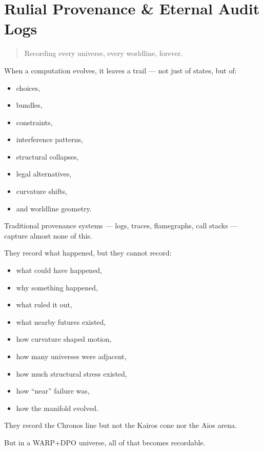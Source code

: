 \chapter{Rulial Provenance \& Eternal Audit Logs}\label{chapter-19-rulial-provenance-eternal-audit-logs}

\begin{quote}
Recording every universe, every worldline, forever.
\end{quote}

When a computation evolves, it leaves a trail --- not just of states,
but of:

\begin{itemize}
\tightlist
\item
  choices,
\item
  bundles,
\item
  constraints,
\item
  interference patterns,
\item
  structural collapses,
\item
  legal alternatives,
\item
  curvature shifts,
\item
  and worldline geometry.
\end{itemize}

Traditional provenance systems --- logs, traces, flamegraphs, call
stacks --- capture almost none of this.

They record what happened, but they cannot record:

\begin{itemize}
\tightlist
\item
  what could have happened,
\item
  why something happened,
\item
  what ruled it out,
\item
  what nearby futures existed,
\item
  how curvature shaped motion,
\item
  how many universes were adjacent,
\item
  how much structural stress existed,
\item
  how ``near'' failure was,
\item
  how the manifold evolved.
\end{itemize}

They record the Chronos line but not the Kairos cone nor the Aios arena.

But in a WARP+DPO universe, all of that becomes recordable.

